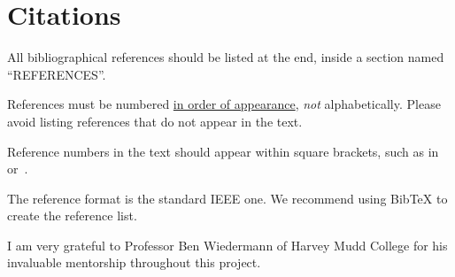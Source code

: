 \documentclass{article}
\begin{document}
\section{Citations}
All bibliographical references should be listed at the end, inside a section named ``REFERENCES''.

References must be numbered {\ul {in order of appearance}}, {\em not} alphabetically. Please avoid listing references that do not appear in the text.

Reference numbers in the text should appear within square brackets, such as 
in~\cite{Someone:09} or~\cite{Someone:04,Someone:13}.

The reference format is the standard IEEE one. We recommend using BibTeX to create the reference list.

\begin{acknowledgments}
I am very grateful to Professor Ben Wiedermann of Harvey Mudd College for his invaluable mentorship throughout this project.
\end{acknowledgments} 


\end{document}
